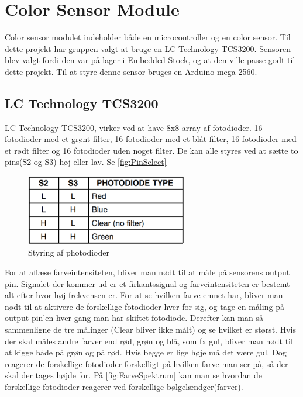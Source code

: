 \graphicspath{{Chapters/Teori/}}


\section{Color Sensor Module}
Color sensor modulet indeholder både en microcontroller og en color sensor. Til dette projekt har gruppen valgt at bruge en LC Technology TCS3200. Sensoren blev valgt fordi den var på lager i Embedded Stock, og at den ville passe godt til dette projekt. Til at styre denne sensor bruges en Arduino mega 2560.

\subsection{LC Technology TCS3200}
LC Technology TCS3200, virker ved at have 8x8 array af fotodioder. 16 fotodioder med et grønt filter, 16 fotodioder med et blåt filter, 16 fotodioder med et rødt filter og 16 fotodioder uden noget filter. De kan alle styres ved at sætte to pins(S2 og S3) høj eller lav. \cite{man:TC3200} Se \autoref{fig:PinSelect}

\begin{figure}[H]
	\centering
	\includegraphics[width = 200pt]{Img/S1S2_color.png}
	\caption{Styring af photodioder}
	\label{fig:PinSelect}
\end{figure}

For at aflæse farveintensiteten, bliver man nødt til at måle på sensorens output pin. Signalet der kommer ud er et firkantssignal og farveintensiteten er bestemt alt efter hvor høj frekvensen er. For at se hvilken farve emnet har, bliver man nødt til at aktivere de forskellige fotodioder hver for sig, og tage en måling på output pin'en hver gang man har skiftet fotodiode. Derefter kan man så sammenligne de tre målinger (Clear bliver ikke målt) og se hvilket er størst. Hvis der skal måles andre farver end rød, grøn og blå, som fx gul, bliver man nødt til at kigge både på grøn og på rød. Hvis begge er lige høje må det være gul. Dog reagerer de forskellige fotodioder forskelligt på hvilken farve man ser på, så der skal der tages højde for. På \autoref{fig:FarveSpektrum} kan man se hvordan de forskellige fotodioder reagerer ved forskellige bølgelændger(farver)\cite{man:TC3200}.

